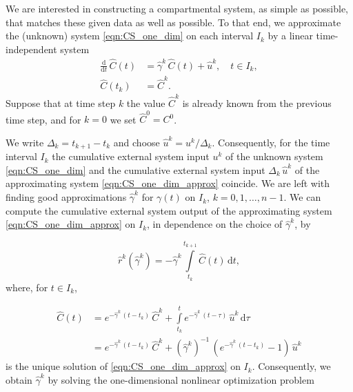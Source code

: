 \documentclass[11pt,a4paper]{article}
\newcommand{\deriv}[1]{\frac{\mathrm{d}}{\mathrm{d}#1}}
\newcommand{\dd}[1]{\,\mathrm{d}#1}
\newcommand{\intl}{\int\limits}
\begin{document}
        We are interested in constructing a compartmental system, as simple as possible, that matches these given data as well as possible.
        To that end, we approximate the (unknown) system \eqref{eqn:CS_one_dim} on each interval $I_k$ by a linear time-independent system
        \begin{equation}\label{eqn:CS_one_dim_approx}
            \begin{aligned}
                \deriv{t}\,\widehat{C}(t) &= \widehat{\gamma}^k\,\widehat{C}(t) + \widehat{u}^k,\quad t\in I_k,\\
                \widehat{C}(t_k) &= \widehat{C}^k.
            \end{aligned}
        \end{equation}
        Suppose that at time step $k$ the value $\widehat{C}^k$ is already known from the previous time step,
        and for $k=0$ we set $\widehat{C}^0=C^0$.
        
        We write $\Delta_k=t_{k+1}-t_k$ and choose $\widehat{u}^k=u^k/\Delta_k$.
        Consequently, for the time interval $I_k$ the cumulative external system input $u^k$ of the unknown system \eqref{eqn:CS_one_dim} and the cumulative external system input $\Delta_k\,\widehat{u}^k$ of the approximating system \eqref{eqn:CS_one_dim_approx} coincide.
        We are left with finding good approximations $\widehat{\gamma}^k$ for $\gamma(t)$ on $I_k$, $k=0,1,\ldots,n-1$.
        We can compute the cumulative external system output of the approximating system \eqref{eqn:CS_one_dim_approx} on $I_k$, in dependence on the choice of $\widehat{\gamma}^k$, by
        
        \begin{equation*}
            \widehat{r}^k(\widehat{\gamma}^k) = -\widehat{\gamma}^k\intl_{t_k}^{t_{k+1}} \widehat{C}(t)\dd{t},
        \end{equation*}
        where, for $t\in I_k$,
        
        \begin{align*}
            \widehat{C}(t) &= e^{-\widehat{\gamma}^k\,(t-t_k)}\,\widehat{C}^k + \intl_{t_k}^t e^{-\widehat{\gamma}^k\,(t-\tau)}\,\widehat{u}^k\dd{\tau}\\
            &= e^{-\widehat{\gamma}^k\,(t-t_k)}\,\widehat{C}^k + (\widehat{\gamma}^k)^{-1}\,(e^{-\widehat{\gamma}^k\,(t-t_k)}-1)\,\widehat{u}^k
        \end{align*}
        is the unique solution of \eqref{eqn:CS_one_dim_approx} on $I_k$.
        Consequently, we obtain $\widehat{\gamma}^k$ by solving the one-dimensional nonlinear optimization problem
        
\end{document}
